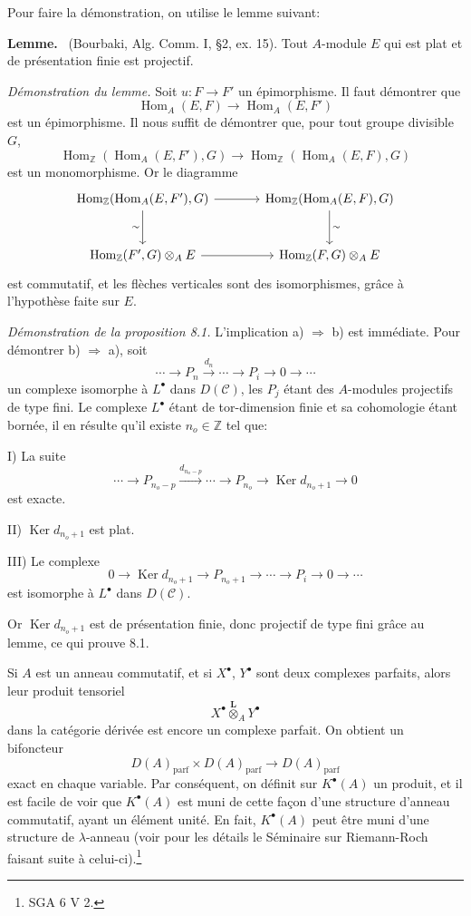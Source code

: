 \documentclass[11pt]{article}
\newenvironment{statement}[1]{\par\medskip\noindent\textbf{#1.}\ }{\par\medskip}
\DeclareMathOperator{\Hom}{Hom}
\providecommand{\Ker}{\operatorname{Ker}}
\providecommand{\parf}{\mathrm{parf}}
\providecommand{\Hom}{\operatorname{Hom}}
\providecommand{\cC}{\mathcal C}
\providecommand{\Ker}{\operatorname{Ker}}
\providecommand{\Ker}{\operatorname{Ker}}
\providecommand{\cC}{\mathcal C}
\providecommand{\parf}{\mathrm{parf}}
\providecommand{\Hom}{\operatorname{Hom}}
\begin{document}
Pour faire la démonstration, on utilise le lemme suivant:

\begin{statement}{Lemme}
(Bourbaki, Alg. Comm. I, §2, ex. 15). Tout $A$-module $E$ qui est plat et de présentation finie est projectif.
\end{statement}

\emph{Démonstration du lemme.} Soit $u:F\to F'$ un épimorphisme. Il faut démontrer que
\[
\Hom_A(E,F)\longrightarrow\Hom_A(E,F')
\]
est un épimorphisme. Il nous suffit de démontrer que, pour tout groupe divisible $G$,
\[
\Hom_{\mathbb Z}(\Hom_A(E,F'),G)\longrightarrow
\Hom_{\mathbb Z}(\Hom_A(E,F),G)
\]
est un monomorphisme. Or le diagramme
\[
\begin{tikzcd}[column sep=large,row sep=large]
\Hom_{\mathbb Z}(\Hom_A(E,F'),G)
 \arrow[r]\arrow[d,"\sim"']&
\Hom_{\mathbb Z}(\Hom_A(E,F),G)\arrow[d,"\sim"]\\
\Hom_{\mathbb Z}(F',G)\otimes_A E
 \arrow[r]&
\Hom_{\mathbb Z}(F,G)\otimes_A E
\end{tikzcd}
\]
est commutatif, et les flèches verticales sont des isomorphismes, grâce à l'hypothèse faite sur $E$.

\emph{Démonstration de la proposition 8.1.} L'implication a) $\Rightarrow$ b) est immédiate. Pour démontrer b) $\Rightarrow$ a), soit
\[
\cdots\longrightarrow P_n\xrightarrow{d_n}\cdots\longrightarrow P_i\longrightarrow 0\longrightarrow\cdots
\]
un complexe isomorphe à $L^\bullet$ dans $D(\cC)$, les $P_j$ étant des $A$-modules projectifs de type fini. Le complexe $L^\bullet$ étant de tor-dimension finie et sa cohomologie étant bornée, il en résulte qu'il existe $n_o\in\mathbb Z$ tel que:

I) La suite
\[
\cdots\longrightarrow P_{n_o-p}\xrightarrow{d_{n_o-p}}\cdots\longrightarrow
P_{n_o}\longrightarrow \Ker d_{n_o+1}\longrightarrow0
\]
est exacte.

II) $\Ker d_{n_o+1}$ est plat.

III) Le complexe
\[
0\longrightarrow \Ker d_{n_o+1}\longrightarrow P_{n_o+1}\longrightarrow\cdots\longrightarrow P_i\longrightarrow0\longrightarrow\cdots
\]
est isomorphe à $L^\bullet$ dans $D(\cC)$.

Or $\Ker d_{n_o+1}$ est de présentation finie, donc projectif de type fini grâce au lemme, ce qui prouve 8.1.

Si $A$ est un anneau commutatif, et si $X^\bullet$, $Y^\bullet$ sont deux complexes parfaits, alors leur produit tensoriel
\[
X^\bullet\overset{\mathbf L}{\otimes}_A Y^\bullet
\]
dans la catégorie dérivée est encore un complexe parfait. On obtient un bifoncteur
\[
D(A)_{\parf}\times D(A)_{\parf}\longrightarrow D(A)_{\parf}
\]
exact en chaque variable. Par conséquent, on définit sur $K^{\bullet}(A)$ un produit, et il est facile de voir que $K^{\bullet}(A)$ est muni de cette façon d'une structure d'anneau commutatif, ayant un élément unité. En fait, $K^{\bullet}(A)$ peut être muni d'une structure de $\lambda$-anneau (voir pour les détails le Séminaire sur Riemann-Roch faisant suite à celui-ci).\footnote{SGA 6 V 2.}
\end{document}
